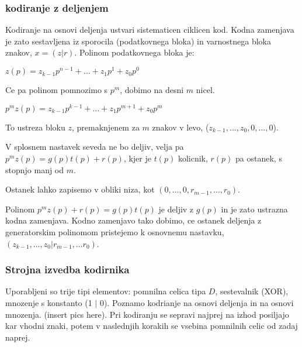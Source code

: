 \documentclass{article}
\begin{document}
\begin{multicols}{3}
\subsubsection{kodiranje z deljenjem}
Kodiranje na osnovi deljenja ustvari sistematicen ciklicen kod. Kodna zamenjava je zato sestavljena iz sporocila
(podatkovnega bloka) in varnostnega bloka znakov, $x = (z | r)$.
Polinom podatkovnega bloka je:
\begin{center}
    \begin{math}
        z(p) = z_{k-1}p^{n-1} + \dots + z_1p^{1} + z_0p^0
    \end{math}
\end{center}
Ce pa polinom pomnozimo s $p^m$, dobimo na desni $m$ nicel.
\begin{center}
    \begin{math}
        p^m z(p) = z_{k-1}p^{k-1} + \dots + z_1p^{m+1} + z_0p^m
    \end{math}
\end{center}
To ustreza bloku $z$, premaknjenem za $m$ znakov v levo, ($z_{k-1}, \dots, z_0, 0, \dots, 0$).

V splosnem nastavek seveda ne bo deljiv, velja pa $p^mz(p) = g(p)t(p) + r(p)$, kjer je $t(p)$ kolicnik,
$r(p)$ pa ostanek, s stopnjo manj od $m$.

Ostanek lahko zapisemo v obliki niza, kot $(0, \dots, 0, r_{m-1}, \dots, r_0)$.

Polinom $p^m z(p) + r(p) = g(p)t(p)$ je deljiv z $g(p)$ in je zato ustrazna kodna zamenjava.
Kodno zamenjavo tako dobimo, ce ostanek deljenja z generatorskim polinomom pristejemo k osnovnemu
nastavku, $(z_{k-1}, \dots, z_0 | r_{m-1}, \dots r_0)$.

\subsubsection{Strojna izvedba kodirnika}
Uporabljeni so trije tipi elementov: pomnilna celica tipa $D$, sestevalnik (XOR), mnozenje s konstanto (1 $|$ 0).
Poznamo kodrianje na osnovi deljenja in na osnovi mnozenja. (insert pics here).
Pri kodiranju se sepravi najprej na izhod posiljajo kar vhodni znaki, potem v naslednjih korakih se vsebina pomnilnih celic od zadaj naprej.


\end{multicols}
\end{document}
